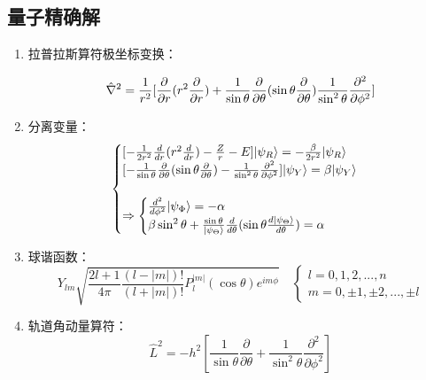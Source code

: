 \subsection{量子精确解}

\begin{enumerate}

	\item 拉普拉斯算符极坐标变换：

	\begin{equation}
	\hat{\nabla}^2=\frac{1}{r^2}[\frac{\partial}{\partial r}(r^2\frac{\partial}{\partial r})+\frac{1}{\mathrm{sin} \, \theta}\frac{\partial}{\partial \theta}(\mathrm{sin \, \theta}\frac{\partial}{\partial \theta})\frac{1}{\mathrm{sin}^2\,\theta}\frac{\partial^2}{\partial \phi^2}]
	\end{equation}

	\item 分离变量：
	\begin{equation}
	\begin{cases}
	[-\frac{1}{2r^2}\frac{d}{dr}(r^2\frac{d}{dr})-\frac{Z}{r}-E]| \psi_R \rangle=-\frac{\beta}{2r^2}| \psi_{R} \rangle\\
	[-\frac{1}{\mathrm{sin}\, \theta}\frac{\partial}{\partial\theta}(\mathrm{sin}\,\theta\frac{\partial}{\partial \theta})-\frac{1}{\mathrm{sin}^2\,\theta}\frac{\partial^2}{\partial \phi^2}]| \psi_Y \rangle=\beta| \psi_Y \rangle\\
	\\
	\Rightarrow
	\begin{cases}
	\frac{d^2}{d \phi^2}| \psi_\Phi \rangle=-\alpha\\
	\beta\sin^2{\theta}+\frac{\sin{\theta}}{| \psi_\Theta \rangle}\frac{d}{d\theta}(\sin{\theta}\frac{d| \psi_\Theta \rangle}{d\theta})=\alpha
	\end{cases}
	
	\end{cases}
	\end{equation}

	\item 球谐函数：
	\begin{equation}
	Y_{lm}\sqrt{\frac{2l+1}{4\pi}\frac{(l-|m|)!}{(l+|m|)!}P_l^{|m|}(\cos{\theta})e^{im\phi}}\quad 
	\begin{cases}
	l=0,1,2,...,n\\
	m=0,\pm 1,\pm 2,...,\pm l
	\end{cases}
	\end{equation}

	\item 轨道角动量算符：
	\begin{equation}
	\hat{L}^2=-h^2[\frac{1}{\sin{\theta}} \frac{\partial}{\partial \theta}+\frac{1}{\sin^2{\theta}} \frac{\partial^2}{\partial \phi^2}]
	\end{equation}


\end{enumerate}
